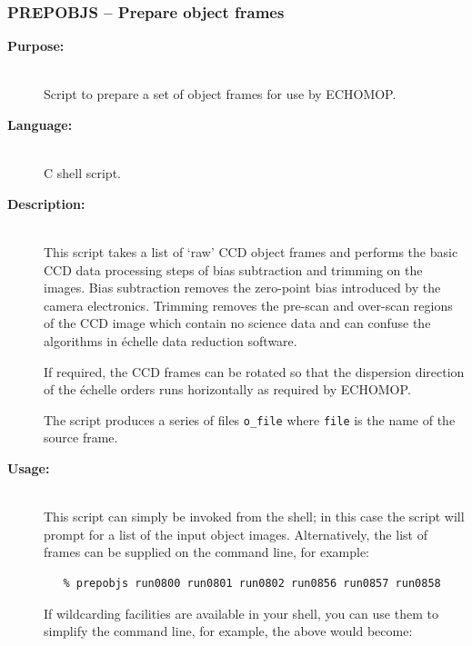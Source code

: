 \documentclass[twoside,11pt]{article}
\newcommand{\stardocinitials}  {SC}
\newcommand{\stardocnumber}    {3.2-0} %
\newcommand{\stardocname}{\stardocinitials /\stardocnumber}
\newcommand{\xref}[3]{#1}
\newcommand{\xlabel}[1]{}
\newcommand{\scspec}[2]{#1}
\newcommand{\scspec}[2]{#2}
\begin{document}
\newpage
\subsubsection{\label{se_prepobjs}\xlabel{prepobjs}PREPOBJS
                \scspec{--}{-} Prepare object frames}
\markboth{PREPOBJS}{\stardocname}

\begin{description}

\item [{\bf Purpose:}] \mbox{} \\
     Script to prepare a set of object frames for use by
     \xref{ECHOMOP}{sun152}{}.

\item [{\bf Language:}] \mbox{} \\
     C shell script.

\item [{\bf Description:}] \mbox{} \\
     This script takes a list of `raw' CCD object frames and performs
     the basic CCD data processing steps of bias subtraction and trimming
     on the images.  Bias subtraction removes the zero-point bias
     introduced by the camera electronics.  Trimming removes the pre-scan
     and over-scan regions of the CCD image which contain no science data
     and can confuse the algorithms in \'{e}chelle data reduction software.

     If required, the CCD frames can be rotated so that the dispersion
     direction of the \'{e}chelle orders runs horizontally as required by
     ECHOMOP.

     The script produces a series of files \verb+o_file+ where
     \verb+file+ is the name of the source frame.

\item [{\bf Usage:}] \mbox{} \\
     This script can simply be invoked from the shell; in this case
     the script will prompt for a list of the input object images.
     Alternatively, the list of frames can be supplied on the
     command line, for example:

\begin{verbatim}
   % prepobjs run0800 run0801 run0802 run0856 run0857 run0858
\end{verbatim}

     If wildcarding facilities are available in your shell, you can use
     them to simplify the command line, for example, the above would
     become:


\end{description}
\end{document}
